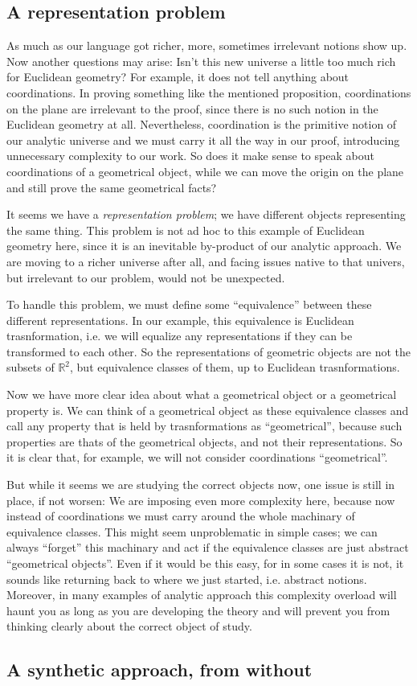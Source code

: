 \subsection*{A representation problem}
As much as our language got richer, more, sometimes irrelevant notions show up.
Now another questions may arise: Isn't this new universe a little too much rich for Euclidean geometry?
For example, it does not tell anything about coordinations.
In proving something like the mentioned proposition, coordinations on the plane are irrelevant to the proof, since there is no such notion in the Euclidean geometry at all.
Nevertheless, coordination is the primitive notion of our analytic universe and we must carry it all the way in our proof, introducing unnecessary complexity to our work.
So does it make sense to speak about coordinations of a geometrical object, while we can move the origin on the plane and still prove the same geometrical facts?

It seems we have a \emph{representation problem}; we have different objects representing the same thing. This problem is not ad hoc to this example of Euclidean geometry here, since it is an inevitable by-product of our analytic approach.
We are moving to a richer universe after all, and facing issues native to that univers, but irrelevant to our problem, would not be unexpected.

To handle this problem, we must define some ``equivalence'' between these different representations.
In our example, this equivalence is Euclidean trasnformation, i.e. we will equalize any representations if they can be transformed to each other.
So the representations of geometric objects are not the subsets of $\mathbb{R}^2$, but equivalence classes of them, up to Euclidean trasnformations.

Now we have more clear idea about what a geometrical object or a geometrical property is. We can think of a geometrical object as these equivalence classes and call any property that is held by trasnformations as ``geometrical'', because such properties are thats of the geometrical objects, and not their representations.
So it is clear that, for example, we will not consider coordinations ``geometrical''.

But while it seems we are studying the correct objects now, one issue is still in place, if not worsen: We are imposing even more complexity here, because now instead of coordinations we must carry around the whole machinary of equivalence classes.
This might seem unproblematic in simple cases; we can always ``forget'' this machinary and act if the equivalence classes are just abstract ``geometrical objects''.
Even if it would be this easy, for in some cases it is not, it sounds like returning back to where we just started, i.e. abstract notions.
Moreover, in many examples of analytic approach this complexity overload will haunt you as long as you are developing the theory and will prevent you from thinking clearly about the correct object of study.


\subsection*{A synthetic approach, from without}

